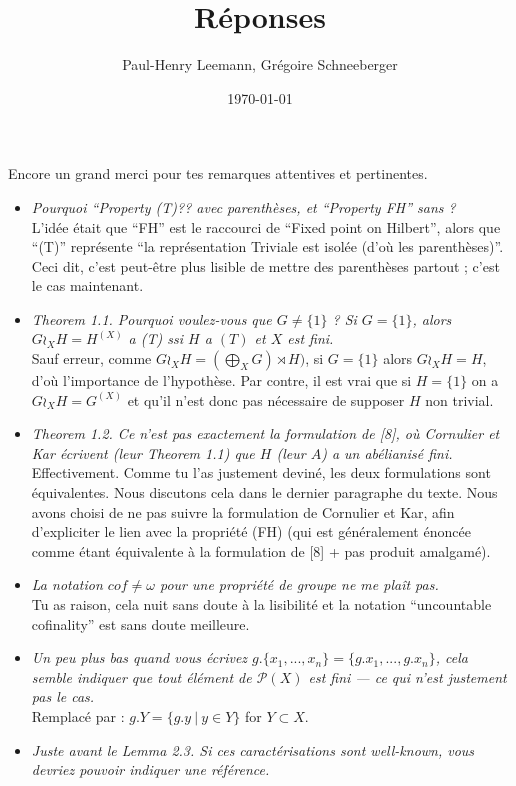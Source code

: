\documentclass[a4paper]{article}
\title{Réponses}
\author{Paul-Henry Leemann, Grégoire Schneeberger}
\date{\today}
\theoremstyle{definition}
\newcommand{\setst}[2]{\{#1\ |\ #2\}}
\begin{document}
\maketitle
%
%
%
%
%
%
%
%
%
%
Encore un grand merci pour tes remarques attentives et pertinentes.

\begin{itemize}
\item
\textit{Pourquoi ``Property (T)?? avec parenthèses, et ``Property FH'' sans ?}\\
L'idée était que ``FH'' est le raccourci de ``Fixed point on Hilbert'', alors que ``(T)'' représente ``la représentation Triviale est isolée (d'où les parenthèses)''. Ceci dit, c'est peut-être plus lisible de mettre des parenthèses partout ; c'est le cas maintenant.
\item
\textit{Theorem 1.1. Pourquoi voulez-vous que $G\neq\{1\}$ ? Si $G = \{1\}$, alors $G\wr_XH = H^{(X)}$ a (T) ssi $H$ a $(T)$ et $X$  est fini.}\\
Sauf erreur, comme $G\wr_XH=(\bigoplus_X G)\rtimes H)$, si $G = \{1\}$ alors $G\wr_XH=H$, d'où l'importance de l'hypothèse. Par contre, il est vrai que si $H=\{1\}$ on a $G\wr_XH=G^{(X)}$ et qu'il n'est donc pas nécessaire de supposer $H$ non trivial.
\item
\textit{Theorem 1.2. Ce n’est pas exactement la formulation de [8], où Cornulier et Kar écrivent (leur Theorem 1.1) que $H$ (leur $A$) a un abélianisé fini.}\\
Effectivement. Comme tu l'as justement deviné, les deux formulations sont équivalentes. Nous discutons cela dans le dernier paragraphe du texte. Nous avons choisi de ne pas suivre la formulation de Cornulier et Kar, afin d'expliciter le lien avec la propriété (FH) (qui est généralement énoncée comme étant équivalente à la formulation de [8] + pas produit amalgamé).
\item
\textit{La notation $cof\neq\omega$ pour une propriété de groupe ne me plaît pas.}\\
Tu as raison, cela nuit sans doute à la lisibilité et la notation ``uncountable cofinality'' est sans doute meilleure.
\item
\textit{Un peu plus bas quand vous écrivez $g.\{x_1,...,x_n\} = \{g.x_1,...,g.x_n\}$, cela semble indiquer que tout élément de $\mathcal P(X)$ est fini --- ce qui n’est justement pas le cas.}\\
Remplacé par : $g.Y=\setst{g.y}{y\in Y}$ for $Y\subset X$.
\item
\textit{Juste avant le Lemma 2.3. Si ces caractérisations sont well-known, vous devriez pouvoir indiquer une référence.}\\

\end{itemize}
\end{document}
